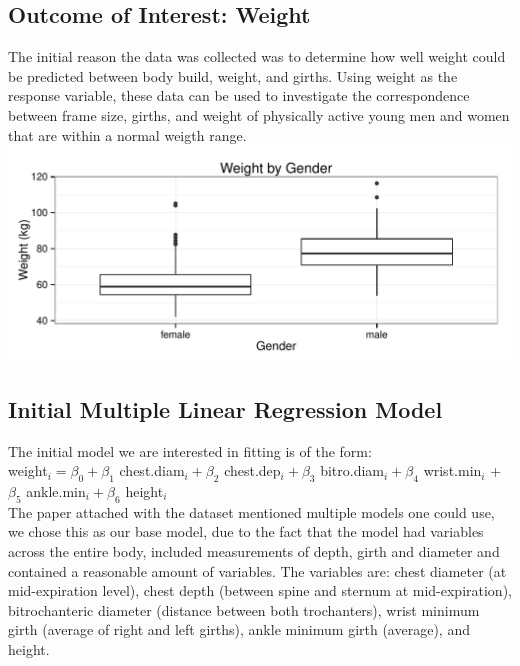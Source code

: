 \documentclass[11pt]{article}\usepackage[]{graphicx}\usepackage[]{color}
\makeatletter
\def\maxwidth{ %
  \ifdim\Gin@nat@width>\linewidth
    \linewidth
  \else
    \Gin@nat@width
  \fi
}
\newenvironment{knitrout}{}{} %
\makeatother
\begin{document}

\subsection{Outcome of Interest: Weight}

The initial reason the data was collected was to determine how well weight could be predicted between body build, weight, and girths. Using weight as the response variable, these data can be used to investigate the correspondence between frame size, girths, and weight of physically active young men and women that are within a normal weigth range. 
\begin{knitrout}
\color{fgcolor}
\includegraphics[width=\maxwidth]{figure/weight_plot} 

\end{knitrout}



\subsection{Initial Multiple Linear Regression Model} %

The initial model we are interested in fitting is of the form:\\

weight$_i = \beta_0 + \beta_1$ chest.diam$_{i} + \beta_2$ chest.dep$_{i} + \beta_3$ bitro.diam$_{i} + \beta_4$ wrist.min$_{i}$ + $\beta_5$ ankle.min$_{i} + \beta_6$ height$_{i}$ \\

The paper attached with the dataset mentioned multiple models one could use, we chose this as our base model, due to the fact that the model had variables across the entire body, included measurements of depth, girth and diameter and contained a reasonable amount of variables. The variables are: chest diameter (at mid-expiration level), chest depth (between spine and sternum at mid-expiration), bitrochanteric diameter (distance between both trochanters),  wrist minimum girth (average of right and left girths), ankle minimum girth (average), and height.
\end{document}
